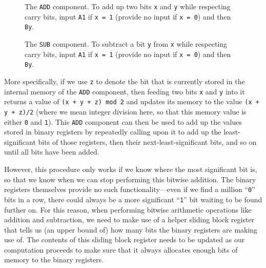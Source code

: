 \begin{figure}[!htb]
	\centering
	\begin{minipage}[t]{0.48\textwidth}
		\centering
		\caption{The \texttt{ADD} component. To add up two bits \texttt{x} and \texttt{y} while respecting carry bits, input \texttt{A1} if \texttt{x = 1} (provide no input if \texttt{x = 0}) and then \texttt{By}.}\label{fig:add_component}
	\end{minipage}\hfill
	\begin{minipage}[t]{0.48\textwidth}
		\centering
		\caption{The \texttt{SUB} component. To subtract a bit \texttt{y} from \texttt{x} while respecting carry bits, input \texttt{A1} if \texttt{x = 1} (provide no input if \texttt{x = 0}) and then \texttt{By}.}\label{fig:sub_component}
	\end{minipage}
\end{figure}

More specifically, if we use \texttt{z} to denote the bit that is currently stored in the internal memory of the \texttt{ADD} component, then feeding two bits \texttt{x} and \texttt{y} into it returns a value of \texttt{(x + y + z) mod 2} and updates its memory to the value \texttt{(x + y + z)/2} (where we mean integer division here, so that this memory value is either \texttt{0} and \texttt{1}). This \texttt{ADD} component can then be used to add up the values stored in binary registers by repeatedly calling upon it to add up the least-significant bits of those registers, then their next-least-significant bits, and so on until all bits have been added.

However, this procedure only works if we know where the most significant bit is, so that we know when we can stop performing this bitwise addition. The binary registers themselves provide no such functionality---even if we find a million ``\texttt{0}'' bits in a row, there could always be a more significant ``\texttt{1}'' bit waiting to be found further on. For this reason, when performing bitwise arithmetic operations like addition and subtraction, we need to make use of a helper sliding block register that tells us (an upper bound of) how many bits the binary registers are making use of. The contents of this sliding block register needs to be updated as our computation proceeds to make sure that it always allocates enough bits of memory to the binary registers.

